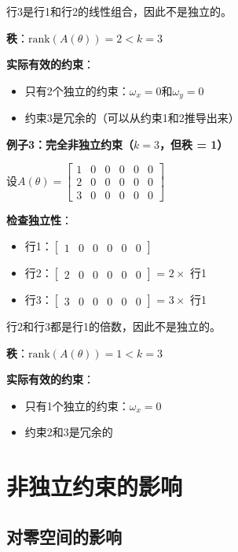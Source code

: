 \documentclass[12pt,a4paper]{article}
\begin{document}
行3是行1和行2的线性组合，因此不是独立的。

\textbf{秩}：$\text{rank}(A(\theta)) = 2 < k = 3$

\textbf{实际有效的约束}：
\begin{itemize}
\item 只有2个独立的约束：$\omega_x = 0$和$\omega_y = 0$
\item 约束3是冗余的（可以从约束1和2推导出来）
\end{itemize}

\textbf{例子3：完全非独立约束（$k = 3$，但秩 = 1）}

设$A(\theta) = \begin{bmatrix}
1 & 0 & 0 & 0 & 0 & 0 \\  %
2 & 0 & 0 & 0 & 0 & 0 \\  %
3 & 0 & 0 & 0 & 0 & 0     %
\end{bmatrix}$

\textbf{检查独立性}：
\begin{itemize}
\item 行1：$\begin{bmatrix} 1 & 0 & 0 & 0 & 0 & 0 \end{bmatrix}$
\item 行2：$\begin{bmatrix} 2 & 0 & 0 & 0 & 0 & 0 \end{bmatrix}$ = $2 \times$ 行1
\item 行3：$\begin{bmatrix} 3 & 0 & 0 & 0 & 0 & 0 \end{bmatrix}$ = $3 \times$ 行1
\end{itemize}

行2和行3都是行1的倍数，因此不是独立的。

\textbf{秩}：$\text{rank}(A(\theta)) = 1 < k = 3$

\textbf{实际有效的约束}：
\begin{itemize}
\item 只有1个独立的约束：$\omega_x = 0$
\item 约束2和3是冗余的
\end{itemize}

\section{非独立约束的影响}

\subsection{对零空间的影响}
\end{document}
